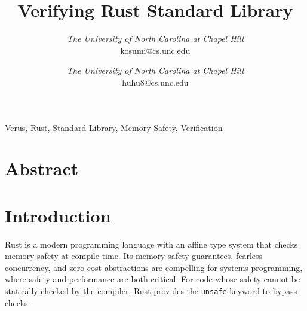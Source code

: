 \documentclass[conference]{IEEEtran}
\begin{document}
\title{Verifying Rust Standard Library}

\author{
\textit{The University of North Carolina at
Chapel Hill}\\
kosumi@cs.unc.edu
\and
{}
\textit{The University of North Carolina at
Chapel Hill}\\
huhu8@cs.unc.edu}
\maketitle


\begin{IEEEkeywords}
Verus, Rust, Standard Library, Memory Safety, Verification 
\end{IEEEkeywords}

\section{Abstract}

\section{Introduction}
Rust\cite{matsakis2014rust} is a modern programming language with an affine type system that checks memory safety at compile time. Its memory safety guarantees, fearless concurrency, and zero-cost abstractions are compelling for systems programming, where safety and performance are both critical. For code whose safety cannot be statically checked by the compiler, Rust provides the \texttt{unsafe} keyword to bypass checks. 
\end{document}
